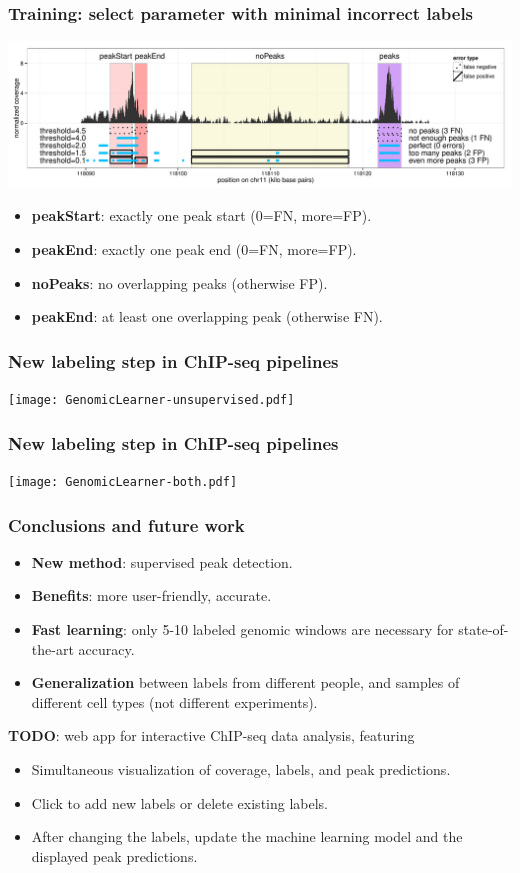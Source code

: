 \documentclass{beamer}
\begin{document}
\begin{frame}
  \frametitle{Training: select parameter with minimal incorrect labels}
  \includegraphics[width=\textwidth]{figure-PeakError.pdf}
  \begin{itemize}
  \item \textbf{peakStart}: exactly one peak start (0=FN, more=FP).
  \item \textbf{peakEnd}: exactly one peak end (0=FN, more=FP).
  \item \textbf{noPeaks}: no overlapping peaks (otherwise FP).
  \item \textbf{peakEnd}: at least one overlapping peak (otherwise FN).
  \end{itemize}
\end{frame}

\begin{frame}
  \frametitle{New labeling step in ChIP-seq pipelines}
  \texttt{[image: GenomicLearner-unsupervised.pdf]}
\end{frame}

\begin{frame}
  \frametitle{New labeling step in ChIP-seq pipelines}
  \texttt{[image: GenomicLearner-both.pdf]}
\end{frame}


\begin{frame}
  \frametitle{Conclusions and future work}
  \begin{itemize}
  \item \textbf{New method}: supervised peak detection.
  \item \textbf{Benefits}: more user-friendly, accurate.
  \item \textbf{Fast learning}: only 5-10 labeled genomic windows are
    necessary for state-of-the-art accuracy.
  \item \textbf{Generalization} between labels from different people,
    and samples of different cell types (not different experiments).
\end{itemize}
 \textbf{TODO}: web app for interactive ChIP-seq data analysis, featuring
\begin{itemize}
  \item Simultaneous visualization of coverage, labels, and peak predictions.
  \item Click to add new labels or delete existing labels.
  \item After changing the labels, update the machine learning model
    and the displayed peak predictions.
  \end{itemize}
\end{frame}
\end{document}
